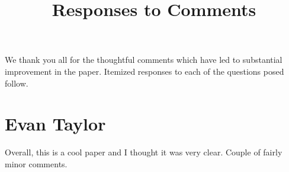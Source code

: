 

\usepackage[stable]{footmisc}

\newcommand*\leftright[2]{%
  \leavevmode
  \rlap{#1}%
  \hspace{0.5\linewidth}%
  #2}

\newcommand{\orth}{\ensuremath{\perp\!\!\!\perp}}%
\newcommand{\indep}{\orth}%
\newcommand{\notorth}{\ensuremath{\perp\!\!\!\!\!\!\diagup\!\!\!\!\!\!\perp}}%
\newcommand{\notindep}{\notorth}



\doublespacing



\singlespacing
\begin{titlepage}

\title{\Large \textbf{Responses to Comments}}

\maketitle
\thispagestyle{empty}
\restoregeometry
\end{titlepage}

\doublespacing

\noindent We thank you all for the thoughtful comments which have led to substantial improvement in the paper. Itemized responses to each of the questions posed follow.

\section{Evan Taylor}

\noindent Overall, this is a cool paper and I thought it was very clear. Couple of fairly minor comments. 


